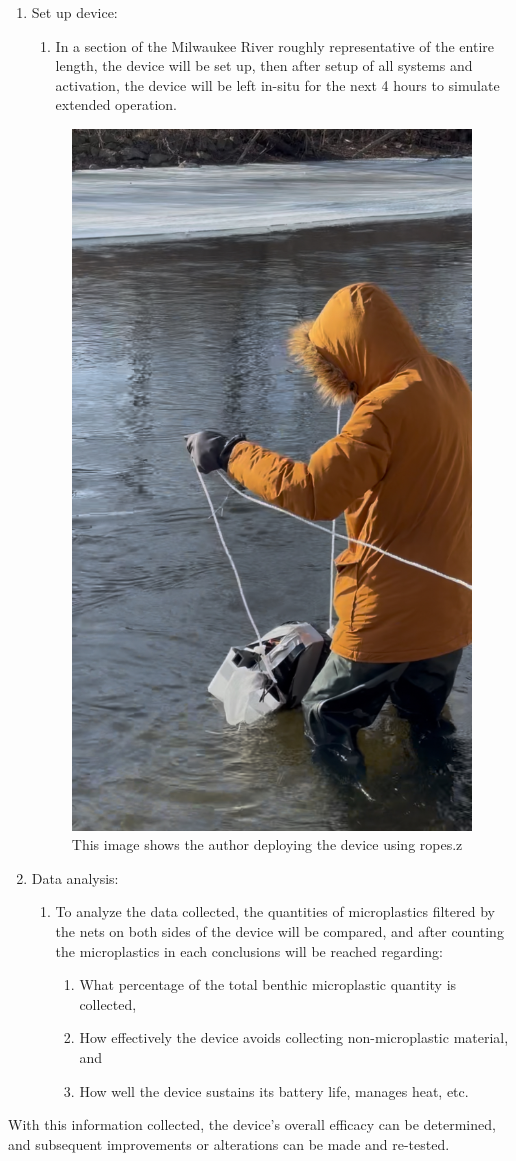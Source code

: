 \documentclass[fleqn,10pt]{SelfArx} %
\begin{document}
\begin{enumerate}
		\item Set up device:
		\begin{enumerate}
			\item In a section of the Milwaukee River roughly representative of the entire length, the device will be set up, then after setup of all systems and activation, the device will be left in-situ for the next 4 hours to simulate extended operation. 
		\end{enumerate}
		\begin{figure}[h]
			\centering
			\includegraphics[width=0.5\linewidth]{Figures/Marionette}
			\caption[Device Deployment]{This image shows the author deploying the device using ropes.z}
			\label{fig:Marionette}
		\end{figure}
		\item Data analysis:
		\begin{enumerate}
			\item To analyze the data collected, the quantities of microplastics filtered by the nets on both sides of the device will be compared, and after counting the microplastics in each conclusions will be reached regarding: 
			\begin{enumerate}
				\item What percentage of the total \gls{benthic} microplastic quantity is collected,
				
				\item How effectively the device avoids collecting non-microplastic material, and
				
				\item How well the device sustains its battery life, manages heat, etc.
				
			\end{enumerate}
		\end{enumerate}
		
	\end{enumerate}
	With this information collected, the device’s overall efficacy can be determined, and subsequent improvements or alterations can be made and re-tested.
	
\end{document}
